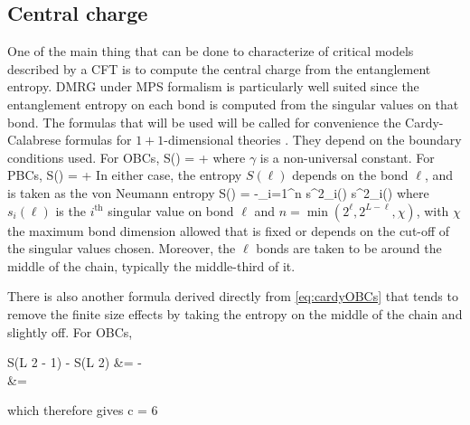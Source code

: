 	\subsection{Central charge}

		One of the main thing that can be done to characterize of critical models described by a CFT is to compute the central charge from the entanglement entropy. DMRG under MPS formalism is particularly well suited since the entanglement entropy on each bond is computed from the singular values on that bond. The formulas that will be used will be called for convenience the Cardy-Calabrese formulas for $1+1$-dimensional theories \cite{calabrese2004}. They depend on the boundary conditions used. For OBCs,
		\be S(\ell) =  \ln{} + \gamma \label{eq:cardyOBCs} \ee
		where $\gamma$ is a non-universal constant. For PBCs, 
		\be S(\ell) =  \ln{} + \gamma \label{eq:cardyPBCs} \ee
		In either case, the entropy $S(\ell)$ depends on the bond $\ell$, and is taken as the von Neumann entropy
		\be S(\ell) = -\sum_{i=1}^{n} s^2_i(\ell) \ln s^2_i(\ell) \ee
		where $s_i(\ell)$ is the $i^\text{th}$ singular value on bond $\ell$ and $n= \min(2^\ell, 2^{L-\ell}, \chi)$, with $\chi$ the maximum bond dimension allowed that is fixed or depends on the cut-off of the singular values chosen. Moreover, the $\ell$ bonds are taken to be around the middle of the chain, typically the middle-third of it.

		There is also another formula derived directly from \eqref{eq:cardyOBCs} that tends to remove the finite size effects \cite{nishimoto2011} by taking the entropy on the middle of the chain and slightly off. For OBCs,
		\be \begin{split} S\left(\frac L 2 - 1\right) - S\left(\frac L 2\right) &=  \ln{} -  \ln {} \\ &=  \ln \cos {} \end{split} \ee
		which therefore gives
		\be c = 6  \label{eq:otherOBCs} \ee